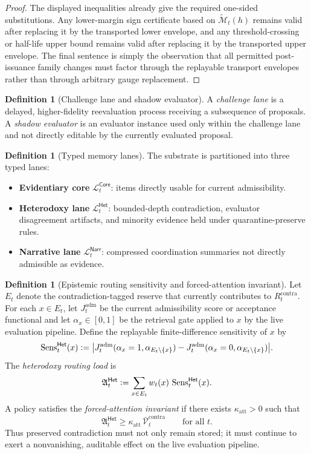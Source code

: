\documentclass[11pt]{article}
\theoremstyle{definition}
\newtheorem{definition}[theorem]{Definition}
\newcommand{\1}{\mathbf{1}}
\newcommand{\Defeq}{\vcentcolon=}
\newcommand{\Core}{\mathsf{Core}}
\newcommand{\Het}{\mathsf{Het}}
\newcommand{\Narr}{\mathsf{Narr}}
\begin{document}
\begin{proof}
The displayed inequalities already give the required one-sided substitutions. Any lower-margin sign certificate based on $\widetilde{\mathcal M}_t(h)$ remains valid after replacing it by the transported lower envelope, and any threshold-crossing or half-life upper bound remains valid after replacing it by the transported upper envelope. The final sentence is simply the observation that all permitted post-issuance family changes must factor through the replayable transport envelopes rather than through arbitrary gauge replacement.
\end{proof}

\begin{definition}[Challenge lane and shadow evaluator]
A \emph{challenge lane} is a delayed, higher-fidelity reevaluation process receiving a subsequence of proposals. A \emph{shadow evaluator} is an evaluator instance used only within the challenge lane and not directly editable by the currently evaluated proposal.
\end{definition}

\begin{definition}[Typed memory lanes]\label{def:lanes}
The substrate is partitioned into three typed lanes:
\begin{itemize}[leftmargin=1.8em]
  \item \textbf{Evidentiary core} $\mathcal L_t^{\Core}$: items directly usable for current admissibility.
  \item \textbf{Heterodoxy lane} $\mathcal L_t^{\Het}$: bounded-depth contradiction, evaluator disagreement artifacts, and minority evidence held under quarantine-preserve rules.
  \item \textbf{Narrative lane} $\mathcal L_t^{\Narr}$: compressed coordination summaries not directly admissible as evidence.
\end{itemize}
\end{definition}

\begin{definition}[Epistemic routing sensitivity and forced-attention invariant]\label{def:forced_attention}
Let $E_t$ denote the contradiction-tagged reserve that currently contributes to $R_t^{\mathrm{contra}}$. For each $x\in E_t$, let $J_t^{\mathrm{adm}}$ be the current admissibility score or acceptance functional and let $\alpha_x\in[0,1]$ be the retrieval gate applied to $x$ by the live evaluation pipeline. Define the replayable finite-difference sensitivity of $x$ by
\[
\operatorname{Sens}_t^{\Het}(x)
\Defeq
\bigl|J_t^{\mathrm{adm}}(\alpha_x=1,\alpha_{E_t\setminus\{x\}})-J_t^{\mathrm{adm}}(\alpha_x=0,\alpha_{E_t\setminus\{x\}})\bigr|.
\]
The \emph{heterodoxy routing load} is
\[
\mathfrak A_t^{\Het}
\Defeq
\sum_{x\in E_t} w_t(x)\,\operatorname{Sens}_t^{\Het}(x).
\]
A policy satisfies the \emph{forced-attention invariant} if there exists $\kappa_{\mathrm{att}}>0$ such that
\[
\mathfrak A_t^{\Het}\ge \kappa_{\mathrm{att}}\,\bar{\mathcal V}_t^{\mathrm{contra}}
\qquad\text{for all }t.
\]
Thus preserved contradiction must not only remain stored; it must continue to exert a nonvanishing, auditable effect on the live evaluation pipeline.
\end{definition}
\end{document}
